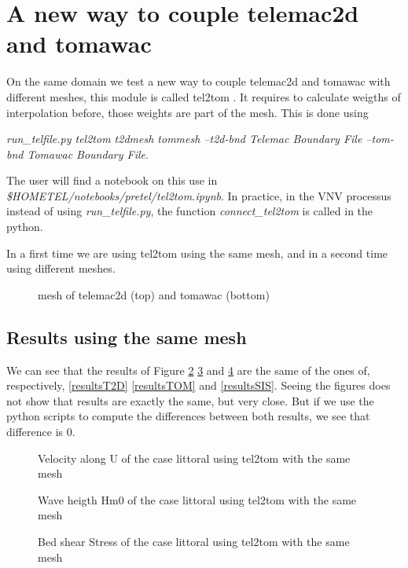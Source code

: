 \section{A new way to couple telemac2d and tomawac}
On the same domain we test a new way to couple telemac2d and tomawac with different meshes,
this module is called tel2tom \cite{breugem2019}. It requires to calculate weigths of
interpolation before, those weights are part of the mesh. This is done using

{\it run\_telfile.py tel2tom t2dmesh tommesh --t2d-bnd Telemac Boundary File --tom-bnd
  Tomawac Boundary File}.

The user will find a notebook on this use in {\it
  \$HOMETEL/notebooks/pretel/tel2tom.ipynb}. In practice, in the VNV processus instead
of using {\it run\_telfile.py}, the function  {\it connect\_tel2tom} is called in the
python.

In a first time we are using tel2tom using the same mesh, and in a second time using
different meshes.

 \begin{figure} [!h]
 \centering
 \label{fondTEL2TOM}
 \caption{mesh of telemac2d (top) and tomawac (bottom)}
 \end{figure}
  
\subsection{Results using the same mesh}
We can see that the results of Figure \ref{resultsTEL2TOM} \ref{resultsTOM2TEL} and
\ref{resultsSISTEL2TOM} are the same of the ones of, respectively, \ref{resultsT2D}
\ref{resultsTOM} and \ref{resultsSIS}. Seeing the figures does not show that results are
exactly the same, but very close. But if we use the python scripts to compute the
differences between both results, we see that difference is 0.

\begin{figure} [!h]
\centering
{}
 \caption{Velocity along U of the case littoral using tel2tom with the same mesh}
\label{resultsTEL2TOM}
\end{figure}
\begin{figure} [!h]
\centering
{}
 \caption{Wave heigth Hm0 of the case littoral using tel2tom with the same mesh}
\label{resultsTOM2TEL}
\end{figure}
\begin{figure} [!h]
\centering
{}
 \caption{Bed shear Stress of the case littoral using tel2tom with the same mesh}
\label{resultsSISTEL2TOM}
\end{figure}


